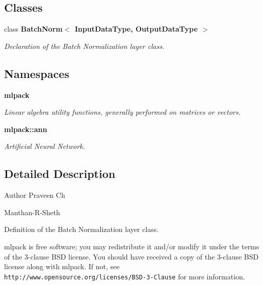 \subsection*{Classes}
\begin{DoxyCompactItemize}
\item 
class \textbf{ Batch\+Norm$<$ Input\+Data\+Type, Output\+Data\+Type $>$}
\begin{DoxyCompactList}\small\item\em Declaration of the Batch Normalization layer class. \end{DoxyCompactList}\end{DoxyCompactItemize}
\subsection*{Namespaces}
\begin{DoxyCompactItemize}
\item 
 \textbf{ mlpack}
\begin{DoxyCompactList}\small\item\em Linear algebra utility functions, generally performed on matrices or vectors. \end{DoxyCompactList}\item 
 \textbf{ mlpack\+::ann}
\begin{DoxyCompactList}\small\item\em Artificial Neural Network. \end{DoxyCompactList}\end{DoxyCompactItemize}


\subsection{Detailed Description}
\begin{DoxyAuthor}{Author}
Praveen Ch 

Manthan-\/\+R-\/\+Sheth
\end{DoxyAuthor}
Definition of the Batch Normalization layer class.

mlpack is free software; you may redistribute it and/or modify it under the terms of the 3-\/clause B\+SD license. You should have received a copy of the 3-\/clause B\+SD license along with mlpack. If not, see {\tt http\+://www.\+opensource.\+org/licenses/\+B\+S\+D-\/3-\/\+Clause} for more information. 